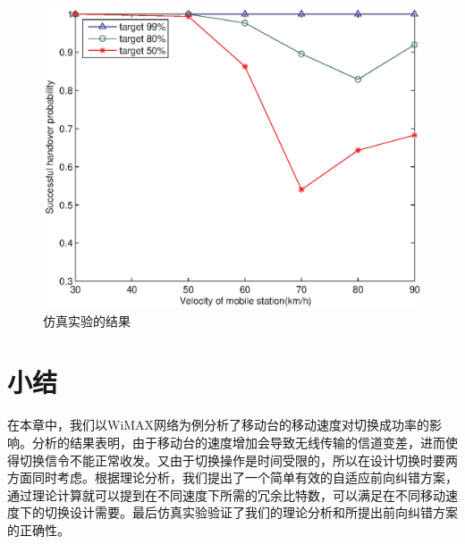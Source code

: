 \begin{figure}[htbp]
\begin{centering}
\includegraphics[scale=0.8]{iccs_speed_prob_simu}
\caption{仿真实验的结果}
\label{fig:chap_iccs_results}
\end{centering}
\end{figure}

\section{小结}
在本章中，我们以WiMAX网络为例分析了移动台的移动速度对切换成功率的影响。分析的结果表明，由于移动台的速度增加会导致无线传输的信道变差，进而使得切换信令不能正常收发。又由于切换操作是时间受限的，所以在设计切换时要两方面同时考虑。根据理论分析，我们提出了一个简单有效的自适应前向纠错方案，通过理论计算就可以提到在不同速度下所需的冗余比特数，可以满足在不同移动速度下的切换设计需要。最后仿真实验验证了我们的理论分析和所提出前向纠错方案的正确性。
